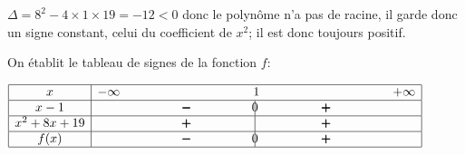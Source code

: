 \begin{enumerate}
\begin{list}{\textbullet}{}
$\Delta = 8^2 - 4\times 1\times 19 = -12<0$ donc le polynôme n'a pas de racine, il garde donc un signe constant, celui du coefficient de $x^2$; il est donc toujours positif.
\end{list}

On établit le tableau de signes de la fonction $f$:

\begin{center}
{\renewcommand{\arraystretch}{1.5}
\def\esp{\hspace*{3cm}}
$\begin{array}{|c | *{5}{c} |} 
\hline
x  & -\infty & \esp & 1 & \esp  & +\infty \\
\hline
x-1 &  & \pmb{-} &  \vline\hspace{-2.7pt}{0} & \pmb{+} &   \\
\hline
x^2+8x+19 &  & \pmb{+} &  \vline\hspace{-2.7pt}{\phantom 0} & \pmb{+} &   \\
\hline
f(x) &  & \pmb{-} &  \vline\hspace{-2.7pt}{0} & \pmb{+} &   \\
\hline
\end{array}$
}
\end{center}


\end{enumerate}


